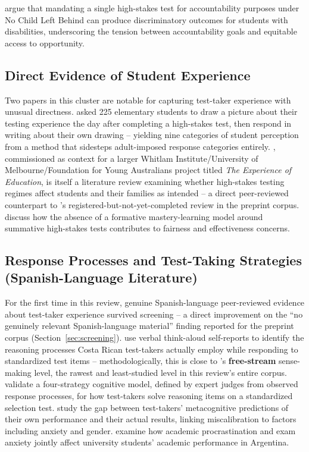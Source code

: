 \documentclass[11pt]{article}
\begin{document}
\citet{albrecht2003accountability} argue that mandating a single high-stakes test for accountability purposes under No Child Left Behind can produce discriminatory outcomes for students with disabilities, underscoring the tension between accountability goals and equitable access to opportunity.

\subsection{Direct Evidence of Student Experience}

Two papers in this cluster are notable for capturing test-taker experience with unusual directness. \citet{triplett2005perceptions} asked 225 elementary students to draw a picture about their testing experience the day after completing a high-stakes test, then respond in writing about their own drawing -- yielding nine categories of student perception from a method that sidesteps adult-imposed response categories entirely. \citet{polesel2012experience}, commissioned as context for a larger Whitlam Institute/University of Melbourne/Foundation for Young Australians project titled \emph{The Experience of Education}, is itself a literature review examining whether high-stakes testing regimes affect students and their families as intended -- a direct peer-reviewed counterpart to \citet{kaleta2025studentperspectives}'s registered-but-not-yet-completed review in the preprint corpus. \citet{zimmerman2008mastery} discuss how the absence of a formative mastery-learning model around summative high-stakes tests contributes to fairness and effectiveness concerns.

\subsection{Response Processes and Test-Taking Strategies (Spanish-Language Literature)}

For the first time in this review, genuine Spanish-language peer-reviewed evidence about test-taker experience survived screening -- a direct improvement on the ``no genuinely relevant Spanish-language material'' finding reported for the preprint corpus (Section~\ref{sec:screening}). \citet{brizuela2016autorreportes} use verbal think-aloud self-reports to identify the reasoning processes Costa Rican test-takers actually employ while responding to standardized test items -- methodologically, this is close to \citeauthor{araneda2025ttxmodel}'s \textbf{free-stream} sense-making level, the rawest and least-studied level in this review's entire corpus. \citet{jimenez2018validacion} validate a four-strategy cognitive model, defined by expert judges from observed response processes, for how test-takers solve reasoning items on a standardized selection test. \citet{chacon2025simulacion} study the gap between test-takers' metacognitive predictions of their own performance and their actual results, linking miscalibration to factors including anxiety and gender. \citet{manchado2021procrastinacion} examine how academic procrastination and exam anxiety jointly affect university students' academic performance in Argentina.
\end{document}
